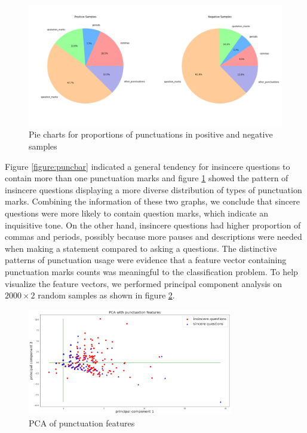 \documentclass[12pt]{diazessay} %
\begin{document}
\begin{figure}[ht] 
    \includegraphics[width=\textwidth, center]{graphs/puncpiecharts.png}
    \caption{Pie charts for proportions of punctuations in positive and negative samples}
    \medskip
    \small
    \label{figure:puncpie}
\end{figure}


Figure \ref{figure:puncbar} indicated a general tendency for insincere questions to contain more than one punctuation marks and figure \ref{figure:puncpie} showed the pattern of insincere questions displaying a more diverse distribution of types of punctuation marks. Combining the information of these two graphs, we conclude that sincere questions were more likely to contain question marks, which indicate an inquisitive tone. On the other hand, insincere questions had higher proportion of commas and periods, possibly because more pauses and descriptions were needed when making a statement compared to asking a questions. The distinctive patterns of punctuation usage were evidence that a feature vector containing punctuation marks counts was meaningful to the classification problem. To help visualize the feature vectors, we performed principal component analysis on $2000 \times 2$ random samples as shown in figure \ref{figure:puncpca}.

\begin{figure}[ht]
    \includegraphics[width=0.8\textwidth, center]{graphs/pca/2Dpunc.png}
    
    \medskip
    \small
    \caption{PCA of punctuation features} 
    \label{figure:puncpca}
\end{figure}
\end{document}
